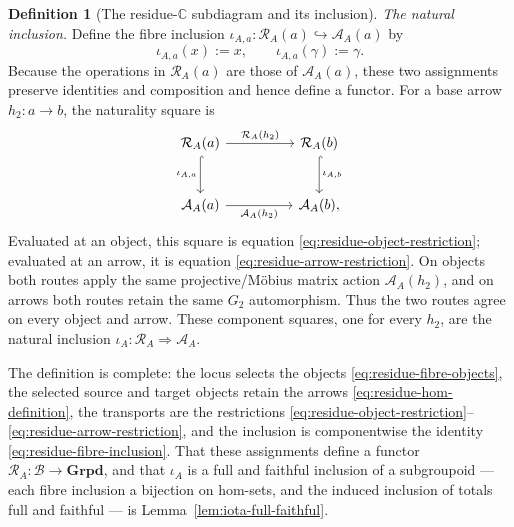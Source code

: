 \documentclass[11pt]{article}
\newcommand{\CC}{\mathbb{C}}
\theoremstyle{plain}
\theoremstyle{definition}
\newtheorem{definition}[theorem]{Definition}
\theoremstyle{remark}
\begin{document}
\begin{definition}[The residue-$\CC$ subdiagram and its inclusion]
\emph{The natural inclusion.}
Define the fibre inclusion
$\iota_{A,a}:\mathcal R_A(a)\hookrightarrow\mathcal A_A(a)$ by
\[
  \iota_{A,a}(x):=x,\qquad
  \iota_{A,a}(\gamma):=\gamma.                         \tag{Inc}\label{eq:residue-fibre-inclusion}
\]
Because the operations in $\mathcal R_A(a)$ are those of $\mathcal A_A(a)$,
these two assignments preserve identities and composition and hence define
a functor.  For a base arrow $h_2:a\to b$, the naturality square is
\[
\begin{tikzcd}[column sep=huge,row sep=large]
\mathcal R_A(a) \arrow[r,"\mathcal R_A(h_2)"] \arrow[d,hook,"\iota_{A,a}"'] &
\mathcal R_A(b) \arrow[d,hook,"\iota_{A,b}"]\\
\mathcal A_A(a) \arrow[r,"\mathcal A_A(h_2)"'] & \mathcal A_A(b),
\end{tikzcd}
\]
Evaluated at an object, this square is equation
\eqref{eq:residue-object-restriction}; evaluated at an arrow, it is equation
\eqref{eq:residue-arrow-restriction}.  On objects both routes apply the
same projective/M\"obius matrix action $\mathcal A_A(h_2)$, and on arrows
both routes retain the same $G_2$ automorphism.  Thus the two routes agree on every
object and arrow.  These component squares, one for every $h_2$, are the
natural inclusion $\iota_A:\mathcal R_A\Rightarrow\mathcal A_A$.

The definition is complete: the locus selects the objects
\eqref{eq:residue-fibre-objects}, the selected source and target objects retain the arrows
\eqref{eq:residue-hom-definition}, the transports are the restrictions
\eqref{eq:residue-object-restriction}--\eqref{eq:residue-arrow-restriction},
and the inclusion is componentwise the identity
\eqref{eq:residue-fibre-inclusion}.  That these assignments define a
functor $\mathcal R_A:\mathcal B\to\mathbf{Grpd}$, and that $\iota_A$ is a
full and faithful inclusion of a subgroupoid --- each fibre inclusion a
bijection on hom-sets, and the induced inclusion of totals full and
faithful --- is Lemma~\ref{lem:iota-full-faithful}.
\end{definition}
\end{document}
